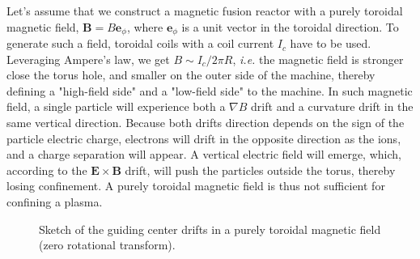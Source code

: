 \documentclass[my_thesis.tex]{subfiles}
\begin{document}
Let's assume that we construct a magnetic fusion reactor with a purely toroidal magnetic field, $\mathbf{B}= B\mathbf{e}_\phi$, where $\mathbf{e}_\phi$ is a unit vector in the toroidal direction. To generate such a field, toroidal coils with a coil current $I_c$ have to be used. Leveraging Ampere's law, we get $B \sim I_c / 2\pi R$, \textit{i.e.} the magnetic field is stronger close the torus hole, and smaller on the outer side of the machine, thereby defining a "high-field side" and a "low-field side" to the machine. In such magnetic field, a single particle will experience both a $\nabla B$ drift and a curvature drift in the same vertical direction. Because both drifts direction depends on the sign of the particle electric charge, electrons will drift in the opposite direction as the ions, and a charge separation will appear. A vertical electric field will emerge, which, according to the $\mathbf{E}\times\mathbf{B}$ drift, will push the particles outside the torus, thereby losing confinement. A purely toroidal magnetic field is thus not sufficient for confining a plasma.

\begin{figure}
    \centering
    \caption{Sketch of the guiding center drifts in a purely toroidal magnetic field (zero rotational transform).}
\end{figure}
\end{document}
